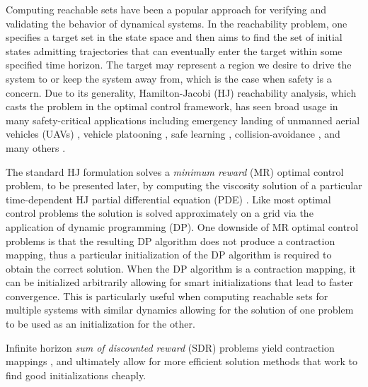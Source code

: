 
Computing reachable sets have been a popular approach for verifying and validating the behavior of dynamical systems. In the reachability problem, one specifies a target set in the state space and then aims to find the set of initial states admitting trajectories that can eventually enter the target within some specified time horizon. The target may represent a region we desire to drive the system to or keep the system away from, which is the case when safety is a concern. Due to its generality, Hamilton-Jacobi (HJ) reachability analysis, which casts the problem in the optimal control framework, has seen broad usage in many safety-critical applications including emergency landing of unmanned aerial vehicles (UAVs) \cite{Ding2016}, vehicle platooning \cite{Chen2015a}, safe learning \cite{Akametalu2014, Gillula2012}, collision-avoidance \cite{Hoffmann2008, Mitchell2005}, and many others \cite{Ding2011a, Huang2011}.

The standard HJ formulation solves a \emph{minimum reward} (MR) optimal control problem, to be presented later, by computing the viscosity solution of a particular time-dependent HJ partial differential equation (PDE) \cite{Mitchell2005}. Like most optimal control problems the solution is solved approximately on a grid via the application of dynamic programming (DP). One downside of MR optimal control problems is that the resulting DP algorithm does not produce a contraction mapping, thus a particular initialization of the DP algorithm is required to obtain the correct solution. When the DP algorithm is a contraction mapping, it can be initialized arbitrarily allowing for smart initializations that lead to faster convergence. This is particularly useful when computing reachable sets for multiple systems with similar dynamics allowing for the solution of one problem to be used as an initialization for the other.

Infinite horizon \emph{sum of discounted reward} (SDR) problems yield contraction mappings \cite{Bertsekas1995}, and ultimately allow for more efficient solution methods that work to find good initializations cheaply.    

 
